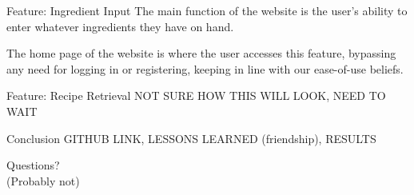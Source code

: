 \documentclass[10pt]{beamer}
\begin{document}
\begin{frame}{Feature: Ingredient Input}
The main function of the website is the user's ability to enter whatever ingredients they have on hand.

The home page of the website is where the user accesses this feature, bypassing any need for logging in or registering, keeping in line with our ease-of-use beliefs.
\end{frame}

\begin{frame}{Feature: Recipe Retrieval}
NOT SURE HOW THIS WILL LOOK, NEED TO WAIT
\end{frame}


\begin{frame}{Conclusion}
 GITHUB LINK, LESSONS LEARNED (friendship), RESULTS
\end{frame}

{
\begin{frame}[standout]
  Questions?\\
  \tiny (Probably not)
\end{frame}
}
\end{document}
